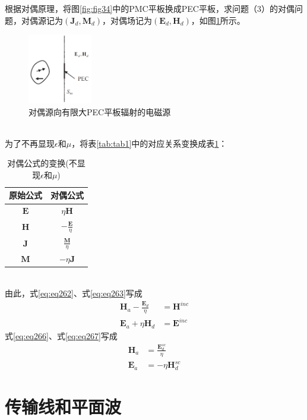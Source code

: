 \documentclass{article}
\numberwithin{equation}{section}
\begin{document}
\par
根据对偶原理，将图\ref{fig:fig34}中的PMC平板换成PEC平板，求问题（3）的对偶问题，对偶源记为$(\mathbf{J}_d,\mathbf{M}_d)$，对偶场记为$(\mathbf{E}_d,\mathbf{H}_d)$，如图\ref{fig:fig35}所示。
\begin{figure}[ht]
    \centering
    \includegraphics[width=0.25\textwidth]{对偶源向有限大PEC平板辐射的电磁源.PNG}
    \caption{对偶源向有限大PEC平板辐射的电磁源}
    \label{fig:fig35}
\end{figure}
\\
为了不再显现$\epsilon$和$\mu$，将表\ref{tab:tab1}中的对应关系变换成表\ref{tab:tab2}：
\begin{table}[!ht]
    \centering
    \caption{对偶公式的变换(不显现$\epsilon$和$\mu$)}
    \label{tab:tab2}
    \begin{tabular}{cc}
        \toprule
        原始公式 & 对偶公式 \\
        \midrule
        $\mathbf{E}$ & $\eta\mathbf{H}$ \\
        $\mathbf{H}$ & $-\frac{\mathbf{E}}{\eta}$ \\
        $\mathbf{J}$ & $\frac{\mathbf{M}}{\eta}$ \\
        $\mathbf{M}$ & $-\eta\mathbf{J}$ \\
        \bottomrule
     \end{tabular}
\end{table}
\\
由此，式\ref{eq:eq262}、式\ref{eq:eq263}写成
\begin{align}
    \label{eq:eq268}
    \mathbf{H}_a-\frac{\mathbf{E}_d}{\eta}&=\mathbf{H}^{inc} \\
    \label{eq:eq269}
    \mathbf{E}_a+\eta\mathbf{H}_d&=\mathbf{E}^{inc}
\end{align}
式\ref{eq:eq266}、式\ref{eq:eq267}写成
\begin{align}
    \label{eq:eq270}
    \mathbf{H}_a&=\frac{\mathbf{E}_d^{sc}}{\eta} \\
    \label{eq:eq271}
    \mathbf{E}_a&=-\eta\mathbf{H}_d^{sc}
\end{align}
\section{传输线和平面波}
\end{document}
